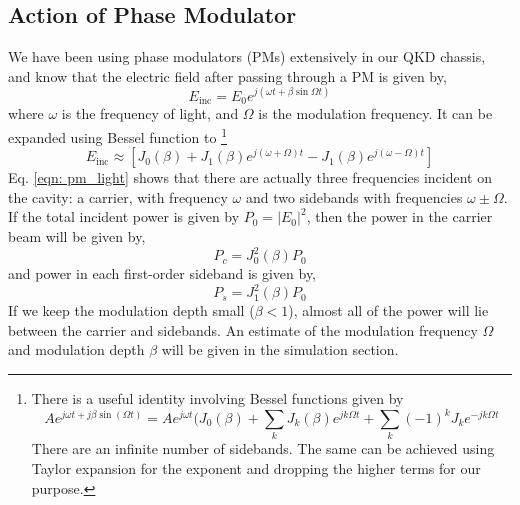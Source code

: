 \documentclass{Resources/cquicc}
\begin{document}
\subsection{Action of Phase Modulator}
We have been using phase modulators (PMs) extensively in our QKD chassis, and know that the electric field after passing through a PM is given by, 
\begin{equation}
    E_{\text{inc}}= E_0 e^{j(\omega t + \beta \sin \Omega t)}
\end{equation}
where $\omega$ is the frequency of light, and $\Omega$ is the modulation frequency. It can be expanded using Bessel function to \footnote{There is a useful identity involving Bessel functions given by $$
Ae^{j\omega t + j \beta \sin (\Omega t)} = A e^{j\omega t }(J_0(\beta)+\sum_k J_k (\beta)e^{jk\Omega t}+\sum_k (-1)^k J_k e^{-jk\Omega t}
$$
There are an infinite number of sidebands. The same can be achieved using Taylor expansion for the exponent and dropping the higher terms for our purpose. }
\begin{equation}
\label{eqn: pm_light}
    E_{\text{inc}} \approx [J_0 (\beta) + J_1(\beta) e^{j (\omega + \Omega)t} - J_1(\beta) e^{j (\omega - \Omega)t}]
\end{equation}
Eq. \ref{eqn: pm_light} shows that there are actually three frequencies incident on the cavity: a carrier, with frequency $\omega$ and two sidebands with frequencies $\omega \pm \Omega$. If the total incident power is given by $P_0 = |E_0|^2$, then the power in the carrier beam will be given by, 
\begin{equation}
    P_c = J_0^2(\beta) P_0
\end{equation}
and power in each first-order sideband is given by,  
\begin{equation}
    P_s = J_1^2(\beta) P_0
\end{equation}
If we keep the modulation depth small ($\beta  < 1$), almost all of the power will lie between the carrier and sidebands. An estimate of the modulation frequency $\Omega$ and modulation depth $\beta$ will be given in the simulation section.
\end{document}
